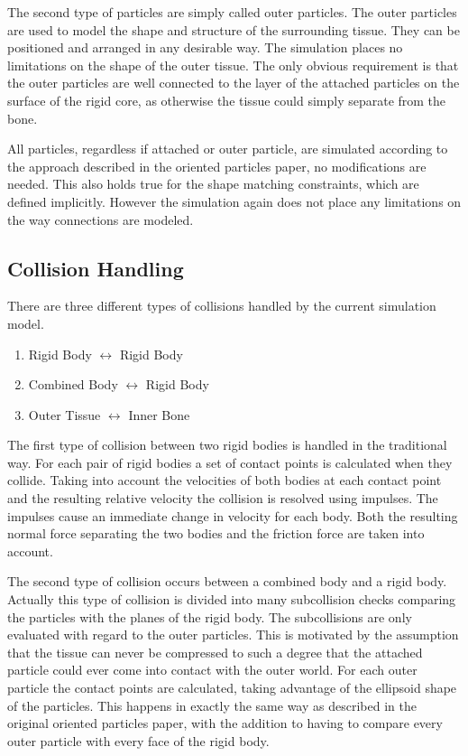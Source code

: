 The second type of particles are simply called outer particles. The outer particles are used to model the shape and structure of the surrounding tissue. They can be positioned and arranged in any desirable way. The simulation places no limitations on the shape of the outer tissue. The only obvious requirement is that the outer particles are well connected to the layer of the attached particles on the surface of the rigid core, as otherwise the tissue could simply separate from the bone.

All particles, regardless if attached or outer particle, are simulated according to the approach described in the oriented particles paper, no modifications are needed. This also holds true for the shape matching constraints, which are defined implicitly. However the simulation again does not place any limitations on the way connections are modeled.

\subsection{Collision Handling}
\label{subsec:theory_collision_handling}

There are three different types of collisions handled by the current simulation model.

\begin{enumerate}
\item Rigid Body $\leftrightarrow$ Rigid Body
\item Combined Body $\leftrightarrow$ Rigid Body
\item Outer Tissue $\leftrightarrow$ Inner Bone
\end{enumerate}

The first type of collision between two rigid bodies is handled in the traditional way. For each pair of rigid bodies a set of contact points is calculated when they collide. Taking into account the velocities of both bodies at each contact point and the resulting relative velocity the collision is resolved using impulses. The impulses cause an immediate change in velocity for each body. Both the resulting normal force separating the two bodies and the friction force are taken into account.

The second type of collision occurs between a combined body and a rigid body. Actually this type of collision is divided into many subcollision checks comparing the particles with the planes of the rigid body. The subcollisions are only evaluated with regard to the outer particles. This is motivated by the assumption that the tissue can never be compressed to such a degree that the attached particle could ever come into contact with the outer world. For each outer particle the contact points are calculated, taking advantage of the ellipsoid shape of the particles. This happens in exactly the same way as described in the original oriented particles paper, with the addition to having to compare every outer particle with every face of the rigid body. 


